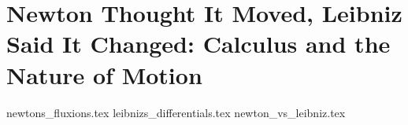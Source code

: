 \section{Newton Thought It Moved, Leibniz Said It Changed: Calculus and the Nature of Motion}

{newtons_fluxions.tex}
{leibnizs_differentials.tex}
{newton_vs_leibniz.tex}